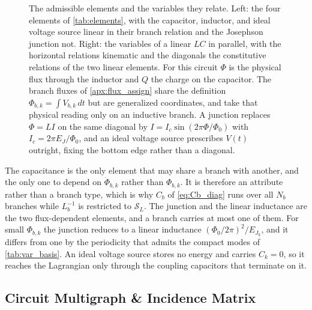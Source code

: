 \documentclass[10pt,aps,pra,onecolumn,superscriptaddress,floatfix,nofootinbib]{revtex4-2}
\begin{document}
\begin{figure}[t]
{%
    }
    \caption{The admissible elements and the variables they relate.
    Left: the four elements of \cref{tab:elements}, with the capacitor, inductor, and ideal voltage source linear in their branch relation and the Josephson junction not.
    Right: the variables of a linear $LC$ in parallel, with the horizontal relations kinematic and the diagonals the constitutive relations of the two linear elements.
    For this circuit $\Phi$ is the physical flux through the inductor and $Q$ the charge on the capacitor.
    The branch fluxes of \cref{apx:flux_assign} share the definition $\Phi_{b,k} = \int V_{b,k}\,dt$ but are generalized coordinates, and take that physical reading only on an inductive branch.
    A junction replaces $\Phi = LI$ on the same diagonal by $I = I_c\sin(2\pi\Phi/\Phi_0)$ with $I_c = 2\pi E_{J}/\Phi_0$, and an ideal voltage source prescribes $V(t)$ outright, fixing the bottom edge rather than a diagonal.}
    \label{fig:elements_variables}
\end{figure}

The capacitance is the only element that may share a branch with another, and the only one to depend on $\dot\Phi_{b,k}$ rather than $\Phi_{b,k}$.
It is therefore an attribute rather than a branch type, which is why $C_b$ of \cref{eq:Cb_diag} runs over all $N_b$ branches while $L_b^{-1}$ is restricted to $\mathcal{S}_L$.
The junction and the linear inductance are the two flux-dependent elements, and a branch carries at most one of them.
For small $\Phi_{b,k}$ the junction reduces to a linear inductance $(\Phi_0/2\pi)^2/E_{J_k}$, and it differs from one by the periodicity that admits the compact modes of \cref{tab:var_basis}.
An ideal voltage source stores no energy and carries $C_k = 0$, so it reaches the Lagrangian only through the coupling capacitors that terminate on it.

\subsection{Circuit Multigraph \& Incidence Matrix}
\end{document}
